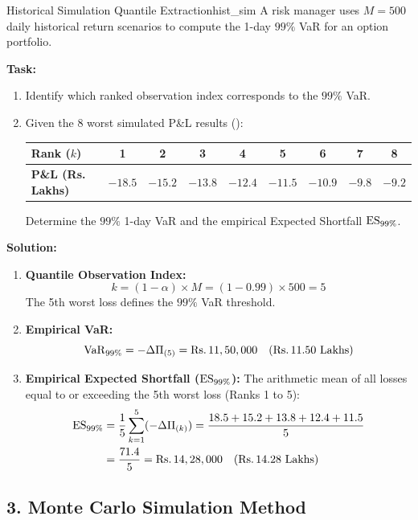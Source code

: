 \begin{example}{Historical Simulation Quantile Extraction}{hist_sim}
A risk manager uses $M = 500$ daily historical return scenarios to compute the 1-day $99\%$ VaR for an option portfolio.

\textbf{Task:}
\begin{enumerate}[leftmargin=1.2em, itemsep=2pt]
    \item Identify which ranked observation index corresponds to the $99\%$ VaR.
    \item Given the 8 worst simulated P\&L results (\inr):
    \begin{center}
    \footnotesize
    \setlength{\tabcolsep}{4.5pt}
    \begin{tabular}{lcccccccc}
    \toprule
    \textbf{Rank ($k$)} & 1 & 2 & 3 & 4 & 5 & 6 & 7 & 8 \\
    \midrule
    \textbf{P\&L (Rs. Lakhs)} & $-18.5$ & $-15.2$ & $-13.8$ & $-12.4$ & $-11.5$ & $-10.9$ & $-9.8$ & $-9.2$ \\
    \bottomrule
    \end{tabular}
    \end{center}
    Determine the $99\%$ 1-day VaR and the empirical Expected Shortfall $\operatorname{ES}_{99\%}$.
\end{enumerate}

\textbf{Solution:}
\begin{enumerate}[leftmargin=1.2em, itemsep=2pt]
    \item \textbf{Quantile Observation Index:}
    \[
    k = (1 - \alpha) \times M = (1 - 0.99) \times 500 = 5
    \]
    The 5th worst loss defines the $99\%$ VaR threshold.
    \item \textbf{Empirical VaR:}
    \[
    \operatorname{VaR}_{99\%} = -\Delta \Pi_{(5)} = \text{Rs.}\, 11,50,000 \quad (\text{Rs.}\, 11.50 \text{ Lakhs})
    \]
    \item \textbf{Empirical Expected Shortfall ($\operatorname{ES}_{99\%}$):}
    The arithmetic mean of all losses equal to or exceeding the 5th worst loss (Ranks 1 to 5):
    \begin{align*}
    \operatorname{ES}_{99\%} &= \frac{1}{5} \sum_{k=1}^5 (-\Delta \Pi_{(k)}) = \frac{18.5 + 15.2 + 13.8 + 12.4 + 11.5}{5} \\
    &= \frac{71.4}{5} = \text{Rs.}\, 14,28,000 \quad (\text{Rs.}\, 14.28 \text{ Lakhs})
    \end{align*}
\end{enumerate}
\end{example}

\subsection{3. Monte Carlo Simulation Method}

